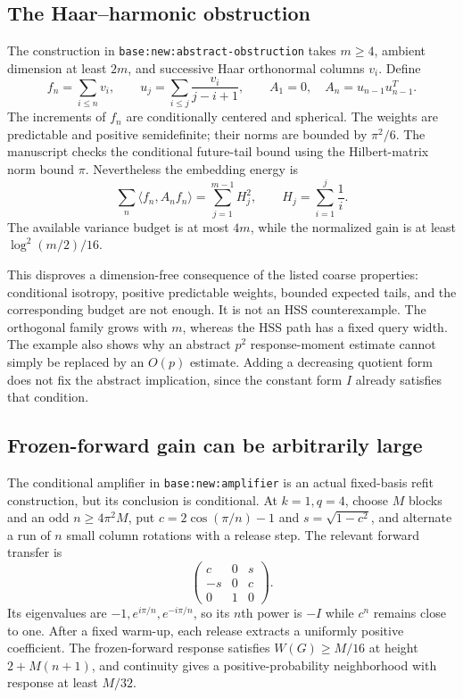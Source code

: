 \documentclass[11pt,oneside,openany,a4paper]{report}
\numberwithin{equation}{chapter}
\theoremstyle{definition}
\theoremstyle{remark}
\begin{document}
\subsection{The Haar--harmonic obstruction}

The construction in \texttt{base:new:abstract-obstruction} takes
$m\ge4$, ambient dimension at least $2m$, and successive Haar
orthonormal columns $v_i$.  Define
\[
 f_n=\sum_{i\le n}v_i,\qquad
 u_j=\sum_{i\le j}\frac{v_i}{j-i+1},\qquad
 A_1=0,\quad A_n=u_{n-1}u_{n-1}^T.
\]
The increments of $f_n$ are conditionally centered and spherical.
The weights are predictable and positive semidefinite; their norms
are bounded by $\pi^2/6$.  The manuscript checks the conditional
future-tail bound using the Hilbert-matrix norm bound $\pi$.
Nevertheless the embedding energy is
\[
 \sum_n\langle f_n,A_nf_n\rangle
 =\sum_{j=1}^{m-1}H_j^2,
 \qquad H_j=\sum_{i=1}^j\frac1i.
\]
The available variance budget is at most $4m$, while the normalized
gain is at least $\log^2(m/2)/16$.

This disproves a dimension-free consequence of the listed coarse
properties: conditional isotropy, positive predictable weights,
bounded expected tails, and the corresponding budget are not enough.
It is not an HSS counterexample.  The orthogonal family grows with
$m$, whereas the HSS path has a fixed query width.  The example also
shows why an abstract $p^2$ response-moment estimate cannot simply be
replaced by an $O(p)$ estimate.  Adding a decreasing quotient form does
not fix the abstract implication, since the constant form $I$ already
satisfies that condition.

\subsection{Frozen-forward gain can be arbitrarily large}

The conditional amplifier in \texttt{base:new:amplifier} is an actual
fixed-basis refit construction, but its conclusion is conditional.
At $k=1,q=4$, choose $M$ blocks and an odd
$n\ge4\pi^2M$, put
$c=2\cos(\pi/n)-1$ and $s=\sqrt{1-c^2}$, and alternate a run of
$n$ small column rotations with a release step.  The relevant
forward transfer is
\[
 \begin{pmatrix}c&0&s\\-s&0&c\\0&1&0\end{pmatrix}.
\]
Its eigenvalues are $-1,e^{i\pi/n},e^{-i\pi/n}$, so its $n$th power is
$-I$ while $c^n$ remains close to one.  After a fixed warm-up, each
release extracts a uniformly positive coefficient.  The
frozen-forward response satisfies $W(G)\ge M/16$ at height
$2+M(n+1)$, and continuity gives a positive-probability neighborhood
with response at least $M/32$.
\end{document}
